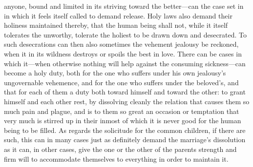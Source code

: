 \documentclass[12pt,a4paper]{book}
\begin{document}
anyone, bound and limited in its striving toward the better---can the case
set in in which it feels itself called to demand release. Holy laws also
demand their holiness maintained thereby, that the human being shall not,
while it itself tolerates the unworthy, tolerate the holiest to be drawn
down and desecrated. To such desecrations can then also sometimes the
vehement jealousy be reckoned, when it in its wildness destroys or spoils
the best in love. There can be cases in which it---when otherwise nothing
will help against the consuming sickness---can become a holy duty, both for
the one who suffers under his own jealousy's ungovernable vehemence, and
for the one who suffers under the beloved's, and that for each of them a
duty both toward himself and toward the other: to grant himself and each
other rest, by dissolving cleanly the relation that causes them so much
pain and plague, and is to them so great an occasion or temptation that
very much is stirred up in their inmost of which it is never good for the
human being to be filled. As regards the solicitude for the common
children, if there are such, this can in many cases just as definitely
demand the marriage's dissolution as it can, in other cases, give the one
or the other of the parents strength and firm will to accommodate
themselves to everything in order to maintain it.
\end{document}
